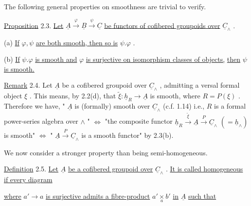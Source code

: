 The following general properties on smoothness are trivial to verify.

\underline{Proposition} 2.3.  \underline{Let}  $\underline{A} \xrightarrow{\ \varphi\ } \underline{B} \xrightarrow{\ \psi\ } \underline{C}$  \underline{be functors of cofibered groupoids over}  $\underline{C}_\wedge$ .

(a)  \underline{If}  $\varphi, \psi$  \underline{are both smooth, then so is}  $\psi.\varphi$ .

(b)  \underline{If}  $\psi.\varphi$  \underline{is smooth and}  $\varphi$  \underline{is surjective on isomorphism classes of objects,}
\underline{then}  $\psi$  \underline{is smooth.}

\underline{Remark} 2.4.  Let  $\underline{A}$  be a cofibered groupoid over  $\underline{C}_\wedge$ , admitting a versal formal object  $\xi$ . This means, by 2.2(d), that  $\tilde{\xi} : \underline{h}_R \to \underline{A}$  is smooth, where  $R = P(\xi)$ . Therefore we have,  " $\underline{A}$  is (formally) smooth over  $\underline{C}_\wedge$  (c.f. 1.14) i.e.,  $R$  is a formal power-series algebra over  $\wedge$ "  $\Leftrightarrow$  "the composite functor  $\underline{h}_R \xrightarrow{\ \tilde{\xi}\ } \underline{A} \xrightarrow{\ P\ } \underline{C}_\wedge$   $(= \underline{h}_\wedge)$   is smooth"  $\Leftrightarrow$  " $\underline{A} \xrightarrow{\ P\ } \underline{C}_\wedge$  is a smooth functor"  by 2.3(b).

We now consider a stronger property than being semi-homogeneous.

\underline{Definition} 2.5.  \underline{Let}  $\underline{A}$  \underline{be a cofibered groupoid over}  $\underline{C}_\wedge$ . \underline{It is called homogeneous if every diagram}

\begin{center}
\end{center}
\underline{where}  $a' \to a$  \underline{is surjective admits a fibre-product}  $a' \underset{a}{\times} b'$  \underline{in}  $\underline{A}$  \underline{such that}

